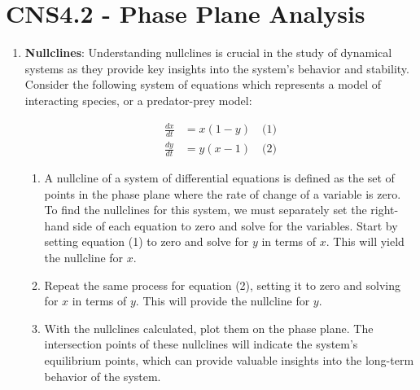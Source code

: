 \documentclass[11pt,letterpaper]{article}
\begin{document}
\section{CNS4.2 - Phase Plane Analysis}
\begin{enumerate}
    \item \textbf{Nullclines}: Understanding nullclines is crucial in the study of dynamical systems as they provide key insights into the system's behavior and stability. Consider the following system of equations which represents a model of interacting species, or a predator-prey model:

    \begin{align*}
        \frac{dx}{dt} &= x(1 - y) \quad \text{(1)} \\
        \frac{dy}{dt} &= y(x - 1) \quad \text{(2)}
    \end{align*}

    \begin{enumerate}
        \item A nullcline of a system of differential equations is defined as the set of points in the phase plane where the rate of change of a variable is zero. To find the nullclines for this system, we must separately set the right-hand side of each equation to zero and solve for the variables. Start by setting equation (1) to zero and solve for $y$ in terms of $x$. This will yield the nullcline for $x$. 

        \vspace{3 cm}

        \item Repeat the same process for equation (2), setting it to zero and solving for $x$ in terms of $y$. This will provide the nullcline for $y$.

        \vspace{3 cm}

        \item With the nullclines calculated, plot them on the phase plane. The intersection points of these nullclines will indicate the system's equilibrium points, which can provide valuable insights into the long-term behavior of the system.

        \pagebreak
    \end{enumerate}


\end{enumerate}
\end{document}
